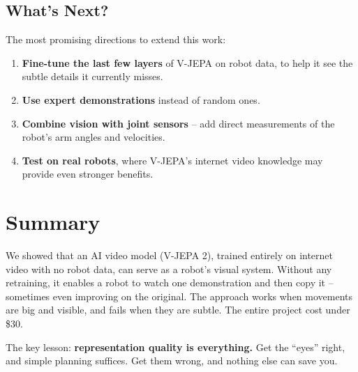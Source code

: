 \documentclass{article}
\begin{document}
\subsection{What's Next?}

The most promising directions to extend this work:
\begin{enumerate}[nosep]
    \item \textbf{Fine-tune the last few layers} of V-JEPA on robot data, to help it see the subtle details it currently misses.
    \item \textbf{Use expert demonstrations} instead of random ones.
    \item \textbf{Combine vision with joint sensors} -- add direct measurements of the robot's arm angles and velocities.
    \item \textbf{Test on real robots}, where V-JEPA's internet video knowledge may provide even stronger benefits.
\end{enumerate}

\section{Summary}

We showed that an AI video model (V-JEPA 2), trained entirely on internet video with no robot data, can serve as a robot's visual system. Without any retraining, it enables a robot to watch one demonstration and then copy it -- sometimes even improving on the original. The approach works when movements are big and visible, and fails when they are subtle. The entire project cost under \$30.

The key lesson: \textbf{representation quality is everything.} Get the ``eyes'' right, and simple planning suffices. Get them wrong, and nothing else can save you.
\end{document}
